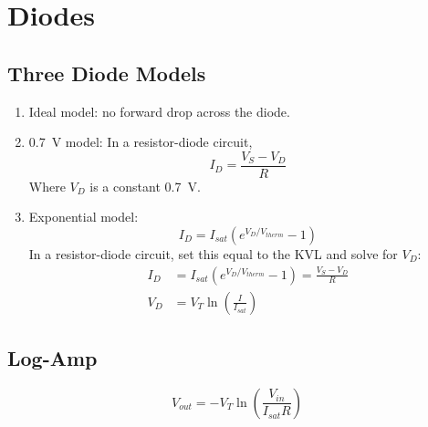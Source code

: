 \chapter{Diodes}

\section{Three Diode Models}
\begin{enumerate}
	\item Ideal model: no forward drop across the diode.
	\item \SI{0.7}{\V} model: In a resistor-diode circuit,
	\[I_D=\frac{V_S-V_D}{R}\]
	Where $V_D$ is a constant \SI{0.7}{\V}.
	\item Exponential model:
	\[I_D = I_{sat}\left(e^{V_D/V_{therm}}-1\right)\]
	In a resistor-diode circuit, set this equal to the KVL and solve for $V_D$:
	\begin{align*}
	I_D &= I_{sat}\left(e^{V_D/V_{therm}}-1\right)=\frac{V_S-V_D}{R} \\
	V_D &= V_T \ln\left(\frac{I}{I_{sat}}\right)
	\end{align*}
		
\end{enumerate}

\section{Log-Amp}
	\[V_{out}=-V_T \ln\left(\frac{V_{in}}{I_{sat}R}\right)\]
